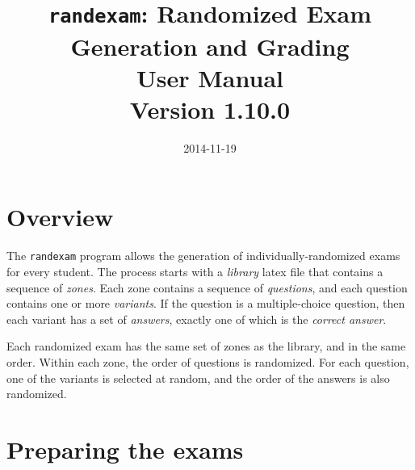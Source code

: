 \documentclass{article}
\begin{document}
\title{\texttt{randexam}: Randomized Exam Generation and Grading\\[1em] User Manual\\[1em] \Large Version 1.10.0}
\date{\vspace*{-2em}2014-11-19}
\maketitle

\section{Overview}

The \texttt{randexam} program allows the generation of
individually-randomized exams for every student. The process starts
with a \emph{library} latex file that contains a sequence of
\emph{zones}. Each zone contains a sequence of \emph{questions}, and
each question contains one or more \emph{variants}. If the question is
a multiple-choice question, then each variant has a set of
\emph{answers}, exactly one of which is the \emph{correct answer}.

Each randomized exam has the same set of zones as the library, and in
the same order. Within each zone, the order of questions is
randomized. For each question, one of the variants is selected at
random, and the order of the answers is also randomized.

\section{Preparing the exams}
\end{document}
